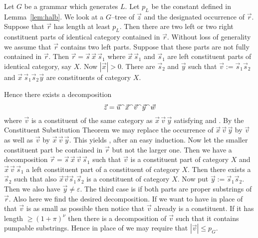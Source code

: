 \proofbeg
Let $G$ be a grammar which generates $L$. Let $p_L$
be the constant defined in Lemma~\ref{lem:halb}. We look at
a $G$--tree of $\vec{z}$ and the designated occurrence of
$\vec{r}$. Suppose that $\vec{r}$ has length at least $p_L$.
Then there are two left or two right constituent parts of
identical category contained in $\vec{r}$. Without loss of
generality we assume that $\vec{r}$ contains two left parts.
Suppose that these parts are not fully contained in $\vec{r}$.
Then $\vec{r} = \vec{s}\,\vec{x}\,\vec{s}_1$ where $\vec{x}\,\vec{s}_1$
and $\vec{s}_1$ are left constituent parts of identical category,
say $X$. Now $|\vec{x}| > 0$. There are $\vec{s}_2$ and $\vec{y}$
such that $\vec{v} := \vec{s}_1\vec{s}_2$ and
$\vec{x}\,\vec{s}_1\vec{s}_2\vec{y}$ are constituents of 
category $X$.

Hence there exists a decomposition
\begin{equation}
\vec{z} = \vec{u} {^{\smallfrown}} \vec{x} {^{\smallfrown}} \vec{v}
{^{\smallfrown}} \vec{y} {^{\smallfrown}} \vec{w} 
\end{equation}
where $\vec{v}$ is a constituent of the same category
as $\vec{x}\,\vec{v}\,\vec{y}$ satisfying  and
. By the Constituent Substitution Theorem we may 
replace the occurrence of $\vec{x}\,\vec{v}\,\vec{y}$ by $\vec{v}$
as well as $\vec{v}$ by $\vec{x}\,\vec{v}\,\vec{y}$.
This yields , after an easy induction.
Now let the smaller constituent part be contained in $\vec{r}$
but not the larger one. Then we have a decomposition
$\vec{r} = \vec{s}\,\vec{x}\,\vec{v}\,\vec{s}_1$ such that $\vec{v}$
is a constituent part of category $X$ and $\vec{x}\,\vec{v}\,\vec{s}_1$
a left constituent part of a constituent of category $X$. Then there
exists a $\vec{s}_2$ such that also $\vec{x}\vec{v}\vec{s}_1\vec{s}_2$
is a constituent of category $X$. Now put $\vec{y} :=
\vec{s}_1\vec{s}_2$. Then we also have $\vec{y} \neq \varepsilon$.
The third case is if both parts are proper substrings of $\vec{r}$.
Also here we find the desired decomposition. If we want to have in 
place of  that $\vec{v}$ is as small as possible then 
notice that $\vec{v}$ already is a
constituent. If it has length $\geq (1+ \pi)^{\nu}$ then
there is a decomposition of $\vec{v}$ such that it contains
pumpable substrings. Hence in place of  we may require 
that $|\vec{v}| \leq p_G$.
\proofend

